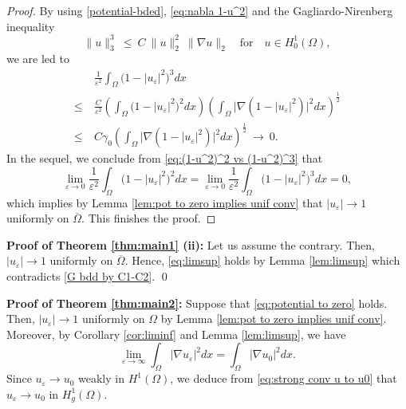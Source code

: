 \documentclass[a4paper,10pt,reqno]{amsart}
\theoremstyle{definition}
\newcommand{\ga}{{\gamma}}
\newcommand{\ve}{{\varepsilon}}
\newcommand{\Om}{{\Omega}}
\newcommand{\qfor}{{\quad \mbox{for} \quad}}
\numberwithin{equation}{section}
\begin{document}
\begin{proof}
By using  \eqref{potential-bded}, \eqref{eq:nabla 1-u^2} and the Gagliardo-Nirenberg inequality
\[ \|u\|_3^3~ \le ~C ~ \|u\|_2^2 ~ \|\nabla u\|_2 \qfor u \in H^1_0(\Om),
\]
we are led to
\begin{align*}
& \frac{1}{\ve^2} \int_\Om   \big(1-|u_\ve|^2 \big)^3 dx \\
\le ~& \frac{C}{\ve^2} \left( \int_\Om   \big(1-|u_\ve|^2 \big)^2 dx \right)  \left( \int_\Om   \big| \nabla (1-|u_\ve|^2 ) \big|^2 dx \right)^{\frac12} \\
\le ~& C \ga_0   \left( \int_\Om  \big| \nabla (1-|u_\ve|^2 ) \big|^2 dx \right)^{\frac12} ~\to ~0.
\end{align*}
In the sequel, we conclude from \eqref{eq:(1-u^2)^2 vs (1-u^2)^3} that
\begin{equation}\label{eq:pot to zero in pf}
\lim_{\ve \to 0} \frac{1}{\ve^2} \int_\Om  \big(1-|u_\ve|^2 \big)^2 dx = \lim_{\ve \to 0} \frac{1}{\ve^2} \int_\Om   \big(1-|u_\ve|^2 \big)^3 dx = 0,
\end{equation}
which implies by Lemma \ref{lem:pot to zero implies unif conv} that   $|u_\ve | \to 1$ uniformly on $\overline\Om$.
This finishes the proof.
\end{proof}





\smallskip
{\bf Proof of Theorem \ref{thm:main1} (ii): }
Let us assume the contrary.
Then,  $|u_\ve| \to 1 $ uniformly on $\overline\Om $.
Hence,   \eqref{eq:limsup} holds by Lemma \ref{lem:limsup} which contradicts \eqref{G bdd by C1-C2}.
\qed  \\
\smallskip


\smallskip
{\bf Proof of Theorem \ref{thm:main2}: }
Suppose that \eqref{eq:potential to zero} holds.
Then, $|u_\ve | \to 1$ uniformly on $\Om$ by Lemma \ref{lem:pot to zero implies unif conv}.
Moreover, by Corollary \ref{cor:liminf} and Lemma \ref{lem:limsup}, we have
\[ \lim_{\ve \to \infty} \int_\Om  |\nabla u_\ve |^2  dx = \int_\Om |\nabla u_0 |^2  dx.
\]
Since $u_\ve \to u_0$ weakly in $H^1(\Om)$, we deduce from \eqref{eq:strong conv u to u0} that   $u_\ve \to u_0$ in $H_g^1(\Om)$.
\end{document}
